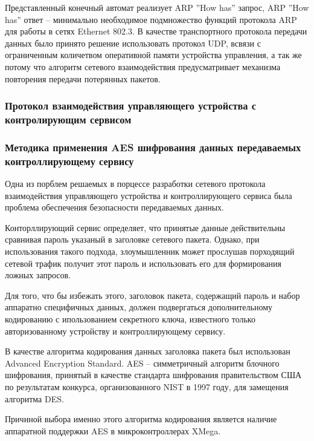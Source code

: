 Представленный конечный автомат реализует ARP ''How has'' запрос, ARP ''How has'' ответ --
минимально необходимое подмножество функций протокола ARP для работы в сетях Ethernet 802.3.
В качестве транспортного протокола передачи данных было принято решение использовать
протокол UDP, всвязи с ограниченным количетвом оперативной памяти устройства управления, а так же
потому что алгоритм сетевого взаимодействия  предусматривает механизма повторения передачи
потерянных пакетов.

\subsubsection{Протокол взаимодействия управляющего устройства с контролирующим сервисом}

\subsubsection{Методика применения AES шифрования данных передаваемых
контроллирующему сервису}
Одна из порблем решаемых в порцессе разработки сетевого протокола 
взаимодействия управляющего устройства и контроллирующего сервиса
была проблема обеспечения безопасности передаваемых данных.


Конторллирующий сервис определяет, что принятые данные действительны
сравнивая пароль указаный в заголовке сетевого пакета. Однако,
при использования такого подхода, злоумышленник может прослушав
порходящий сетевой трафик получит этот пароль и использовать его
для формирования ложных запросов.


Для того, что бы избежать этого, заголовок пакета, содержащий пароль
и набор аппаратно специфичных данных, должен подвергаться дополнительному
кодированию с ипользованием секретного ключа, известного только
авторизованному устройству и контроллирующему сервису.


В качестве алгоритма кодирования данных заголовка пакета был использован
Advanced Encryption Standard. AES -- симметричный алгоритм блочного
шифрования, принятый в качестве стандарта шифрования правительством США
по результатам конкурса, организованного NIST в 1997 году, для замещения
алгоритма DES.


Причиной выбора именно этого алгоритма кодирования является
наличие аппаратной поддержки AES в микроконтроллерах XMega.


